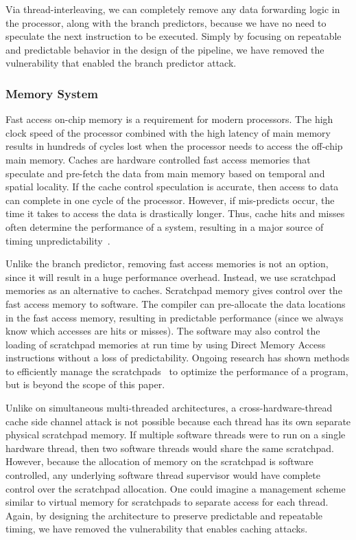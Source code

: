 \documentclass[times, 10pt,twocolumn]{article}
\begin{document}
Via thread-interleaving, we can completely remove any data forwarding logic in the processor, along with the branch predictors, because we have no need to speculate the next instruction to be executed. Simply by focusing on repeatable and predictable behavior in the design of the pipeline, we have removed the vulnerability that enabled the branch predictor attack. 

\subsubsection {Memory System}
Fast access on-chip memory is a requirement for modern processors. The high clock speed of the processor combined with the high latency of main memory results in hundreds of cycles lost when the processor needs to access the off-chip main memory. Caches are hardware controlled fast access memories that speculate and pre-fetch the data from main memory based on temporal and spatial locality. If the cache control speculation is accurate, then access to data can complete in one cycle of the processor. However, if mis-predicts occur, the time it takes to access the data is drastically longer. Thus, cache hits and misses often determine the performance of a system, resulting in a major source of timing unpredictability~\cite{thiele:04:predictable}.

Unlike the branch predictor, removing fast access memories is not an option, since it will result in a huge performance overhead. Instead, we use scratchpad memories as an alternative to caches. Scratchpad memory gives control over the fast access memory to software. The compiler can pre-allocate the data locations in the fast access memory, resulting in predictable performance (since we always know which accesses are hits or misses). The software may also control the loading of scratchpad memories at run time by using Direct Memory Access instructions without a loss of predictability. Ongoing research has shown methods to efficiently manage the scratchpads~\cite{avissar2002oma, Bandyopadhyay:EECS-2006-105, Patel:EECS-2008-115} to optimize the performance of a program, but is beyond the scope of this paper. 

Unlike on simultaneous multi-threaded architectures, a cross-hardware-thread cache side channel attack is not possible because each thread has its own separate physical scratchpad memory. If multiple software threads were to run on a single hardware thread, then two software threads would share the same scratchpad. However, because the allocation of memory on the scratchpad is software controlled, any underlying software thread supervisor would have complete control over the scratchpad allocation. One could imagine a management scheme similar to virtual memory for scratchpads to separate access for each thread. Again, by designing the architecture to preserve predictable and repeatable timing, we have removed the vulnerability that enables caching attacks.
\end{document}
